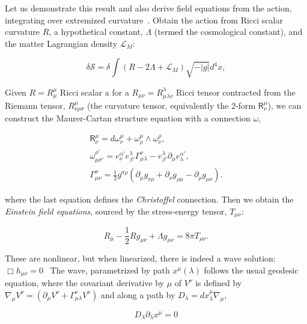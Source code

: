 Let us demonstrate this result and also derive field equations from the action, integrating over extremized curvature~\cite{FarrThesis}.
Obtain the action from Ricci scalar curvature $R$, a hypothetical constant, $\Lambda$ (termed the cosmological constant), and the matter Lagrangian density $\mathcal{L}_M$:

\begin{equation}
\delta \mathcal{S} = \delta \int \left( R - 2\Lambda + \mathcal{L}_M \right) \sqrt{-|g|}d^4 x,
\end{equation}

Given $R = R^\mu_\mu$ Ricci scalar a for a $R_{\mu\nu} = R^\lambda_{\mu\lambda\nu}$ Ricci tensor contracted from the Riemann tensor, $R^\mu_{\nu\rho\sigma}$ (the curvature tensor, equivalently the 2-form $\textsf{R}^\mu_\nu$), we can construct the Maurer-Cartan structure equation with a connection $\omega$,

\begin{eqnarray}
\textsf{R}^\mu_\nu = d\omega^\mu_\nu + \omega^\mu_\rho \wedge \omega^\rho_\nu, \\
\omega^{\rho'}_{\mu\sigma'} = e^{\alpha'}_{\nu} e^{\lambda}_{\beta'} \Gamma^{\nu}_{\mu\lambda} - e^{\lambda}_{\beta'} \partial_{\mu} e^{\alpha'}_{\lambda},\\
\Gamma^\sigma_{\mu\nu} = \frac{1}{2} g^{\sigma\rho} \left( \partial_\mu g_{\nu \rho} + \partial_\nu g_{\rho \mu} - \partial_\rho g_{\mu\nu} \right). 
\end{eqnarray}

\noindent where the last equation defines the \textit{Christoffel} connection. Then we obtain the \textit{Einstein field equations}, sourced by the stress-energy tensor, $T_{\mu\nu}$:

\begin{equation}
R_{\mu} - \frac{1}{2} R g_{\mu\nu} + \Lambda g_{\mu\nu} = 8 \pi T_{\mu\nu}.
\end{equation}

\noindent These are nonlinear, but when linearized, there is indeed a wave solution: $\Box h_{\mu\nu} = 0$~\cite{Carroll1997}
The wave, parametrized by path $x^\mu (\lambda)$ follows the usual geodesic equation, where the covariant derivative by $\mu$ of $V^\nu$ is defined by $\nabla_\mu V^\nu = (\partial_\mu V^\nu + \Gamma^\nu_{\mu\lambda} V^\nu)$ and along a path by $D_\lambda = dx^\mu_\lambda \nabla_\mu$,

\begin{equation}
D_\lambda \partial_\lambda x^\mu = 0
\end{equation}



